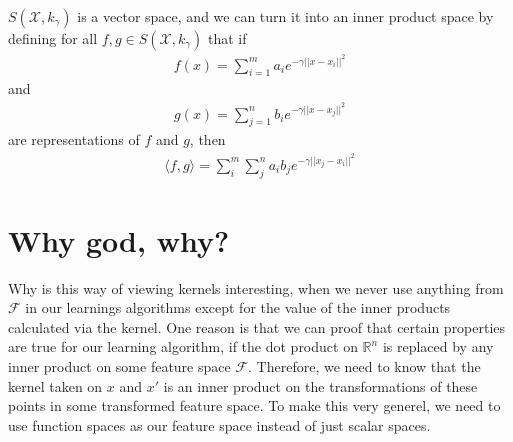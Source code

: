 \documentclass[12pt]{article}
\begin{document}
$S(\mathcal{X},k_\gamma)$ is a vector space, and we can turn it into an inner product space by defining for all $f,g \in S(\mathcal{X},k_\gamma)$ that if 
\begin{align}
f(x) = \sum_{i=1}^m a_ie^{-\gamma||x - x_i ||^2}
\end{align}
and
\begin{align}
g(x) = \sum_{j=1}^n b_ie^{-\gamma||x - x_j ||^2}
\end{align}
are representations of $f$ and $g$, then 
\begin{align}
\langle f, g \rangle = \sum_i^m \sum_j^n a_i b_j e^{-\gamma||x_j - x_i ||^2}
\end{align}

\section{Why god, why?}

Why is this way of viewing kernels interesting, when we never use anything from $\mathcal{F}$ in our learnings algorithms except for the value of the inner products calculated via the kernel. One reason is that we can proof that certain properties are true for our learning algorithm, if the dot product on $\mathbb{R}^n$ is replaced by any inner product on some feature space $\mathcal{F}$. Therefore, we need to know that the kernel taken on $x$ and $x'$ is an inner product on the transformations of these points in some transformed feature space. To make this very generel, we need to use function spaces as our feature space instead of just scalar spaces. 
\end{document}
